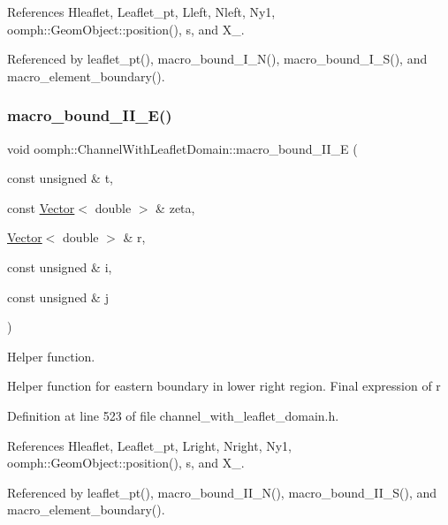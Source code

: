 References Hleaflet, Leaflet\+\_\+pt, Lleft, Nleft, Ny1, oomph\+::\+Geom\+Object\+::position(), s, and X\+\_.



Referenced by leaflet\+\_\+pt(), macro\+\_\+bound\+\_\+\+I\+\_\+\+N(), macro\+\_\+bound\+\_\+\+I\+\_\+\+S(), and macro\+\_\+element\+\_\+boundary().

\mbox{\label{classoomph_1_1ChannelWithLeafletDomain_a9083a5ac562feb1cd33d78e6cc18b257}} 
\subsubsection{\texorpdfstring{macro\+\_\+bound\+\_\+\+I\+I\+\_\+\+E()}{macro\_bound\_II\_E()}}
{\footnotesize\ttfamily void oomph\+::\+Channel\+With\+Leaflet\+Domain\+::macro\+\_\+bound\+\_\+\+I\+I\+\_\+E (\begin{DoxyParamCaption}\item[{const unsigned \&}]{t,  }\item[{const \hyperlink{classoomph_1_1Vector}{Vector}$<$ double $>$ \&}]{zeta,  }\item[{\hyperlink{classoomph_1_1Vector}{Vector}$<$ double $>$ \&}]{r,  }\item[{const unsigned \&}]{i,  }\item[{const unsigned \&}]{j }\end{DoxyParamCaption})\hspace{0.3cm}{\ttfamily [protected]}}



Helper function. 

Helper function for eastern boundary in lower right region. Final expression of r 

Definition at line 523 of file channel\+\_\+with\+\_\+leaflet\+\_\+domain.\+h.



References Hleaflet, Leaflet\+\_\+pt, Lright, Nright, Ny1, oomph\+::\+Geom\+Object\+::position(), s, and X\+\_.



Referenced by leaflet\+\_\+pt(), macro\+\_\+bound\+\_\+\+I\+I\+\_\+\+N(), macro\+\_\+bound\+\_\+\+I\+I\+\_\+\+S(), and macro\+\_\+element\+\_\+boundary().

